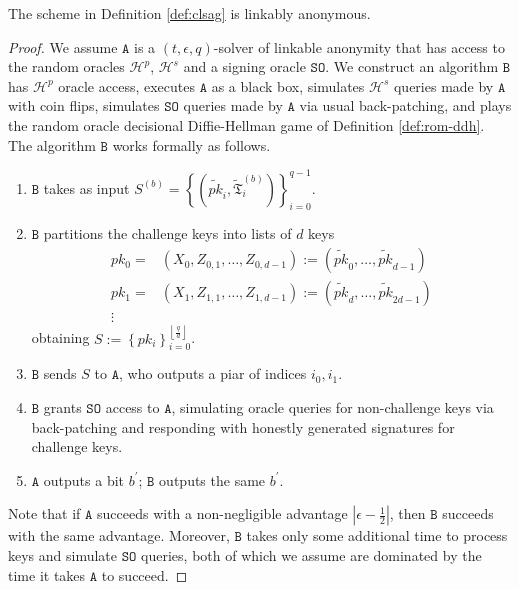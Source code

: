 \documentclass{llncs}
\begin{document}
\begin{theorem}
The scheme in Definition \ref{def:clsag} is linkably anonymous.
\end{theorem}

\begin{proof}
We assume $\texttt{A}$ is a $(t, \epsilon, q)$-solver of linkable anonymity that has access to the random oracles $\mathcal{H}^p$, $\mathcal{H}^s$ and a signing oracle $\texttt{SO}$. We construct an algorithm $\texttt{B}$ has $\mathcal{H}^p$ oracle access, executes $\texttt{A}$ as a black box, simulates $\mathcal{H}^s$ queries made by $\texttt{A}$ with coin flips, simulates $\texttt{SO}$ queries made by $\texttt{A}$ via usual back-patching, and plays the random oracle decisional Diffie-Hellman game of Definition \ref{def:rom-ddh}. The algorithm $\texttt{B}$ works formally as follows.

\begin{enumerate}[(1)]
\item $\texttt{B}$ takes as input $S^{(b)} = \left\{(\widetilde{pk}_i, \widetilde{\mathfrak{T}}_i^{(b)})\right\}_{i=0}^{q-1}$.

\item $\texttt{B}$ partitions the challenge keys into lists of $d$ keys
\begin{align*}
pk_0 =&  (X_0, Z_{0, 1}, \ldots, Z_{0, d-1}) := (\widetilde{pk}_0, \ldots, \widetilde{pk}_{d-1}) \\
pk_1 =& (X_1, Z_{1, 1}, \ldots, Z_{1, d-1}) := (\widetilde{pk}_d, \ldots, \widetilde{pk}_{2d-1}) \\
\vdots
\end{align*} obtaining $S := \left\{pk_i\right\}_{i=0}^{\left\lfloor \frac{q}{d}\right\rfloor}$.

\item $\texttt{B}$ sends $S$ to $\texttt{A}$, who outputs a piar of indices $i_0, i_1$.

\item $\texttt{B}$ grants $\texttt{SO}$ access to $\texttt{A}$, simulating oracle queries for non-challenge keys via back-patching and responding with honestly generated signatures for challenge keys.

\item $\texttt{A}$ outputs a bit $b^\prime$; $\texttt{B}$ outputs the same $b^\prime$.
\end{enumerate}

Note that if $\texttt{A}$ succeeds with a non-negligible advantage $\left|\epsilon - \frac{1}{2}\right|$, then $\texttt{B}$ succeeds with the same advantage. Moreover, $\texttt{B}$ takes only some additional time to process keys and simulate $\texttt{SO}$ queries, both of which we assume are dominated by the time it takes $\texttt{A}$ to succeed.
\end{proof}
\end{document}
